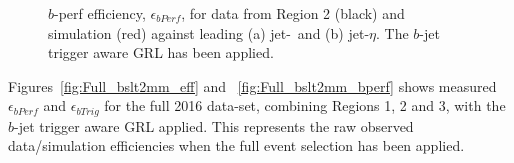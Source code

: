 \begin{figure}[!ht]
\begin{center}
  \end{center}
  \caption{$b$-perf efficiency, $\epsilon_{bPerf}$, for data from Region 2 (black) and simulation (red) against leading (a) jet-\pT~and (b) jet-$\eta$.
    The $b$-jet trigger aware GRL has been applied.}
  \label{fig:Epoch2_bslt2mm_bperf}
\end{figure}

\newpage

Figures~\ref{fig:Full_bslt2mm_eff} and ~\ref{fig:Full_bslt2mm_bperf}  shows measured
$\epsilon_{bPerf}$ and $\epsilon_{bTrig}$
for the full 2016 data-set, combining Regions 1, 2 and 3,
with the $b$-jet trigger aware GRL applied.
This represents the raw observed data/simulation efficiencies when the full event selection has been applied.

\begin{figure}[!ht]
  \begin{center}
    \captionsetup[subfigure]{aboveskip=0pt,justification=centering}
    \\

\end{center}
\end{figure}
